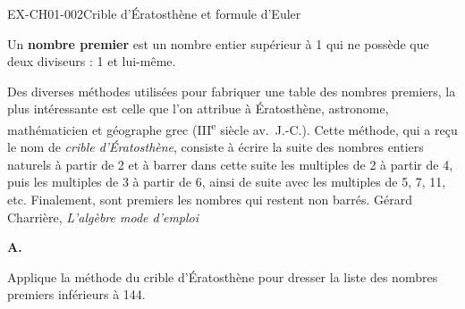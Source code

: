 \documentclass[12pt, a4paper]{article}
\begin{document}
\begin{exercice}{EX-CH01-002}{Crible d'Ératosthène et formule d'Euler}

\begin{mdframed}[backgroundcolor=vlmgray, innerleftmargin=10pt, innerrightmargin=10pt, innertopmargin=6pt, innerbottommargin=6pt, skipabove=-5pt, skipbelow=5pt]
Un \textbf{nombre premier} est un nombre entier supérieur à 1 qui ne possède que deux diviseurs : 1 et lui-même.
\end{mdframed}


\medskip
{\footnotesize Des diverses méthodes utilisées pour fabriquer une table des nombres premiers, la plus intéressante est celle que l'on attribue à Ératosthène, astronome, mathématicien et géographe grec (III\textsuperscript{e} siècle av.\ J.-C.). Cette méthode, qui a reçu le nom de \textit{crible d'Ératosthène}, consiste à écrire la suite des nombres entiers naturels à partir de 2 et à barrer dans cette suite les multiples de 2 à partir de 4, puis les multiples de 3 à partir de 6, ainsi de suite avec les multiples de 5, 7, 11, etc. Finalement, sont premiers les nombres qui restent non barrés. \hfill Gérard Charrière, \textit{L'algèbre mode d'emploi}}

\vfill
\textbf{A.}

\medskip
Applique la méthode du crible d'Ératosthène pour dresser la liste des nombres premiers inférieurs à 144.


\end{exercice}
\end{document}
